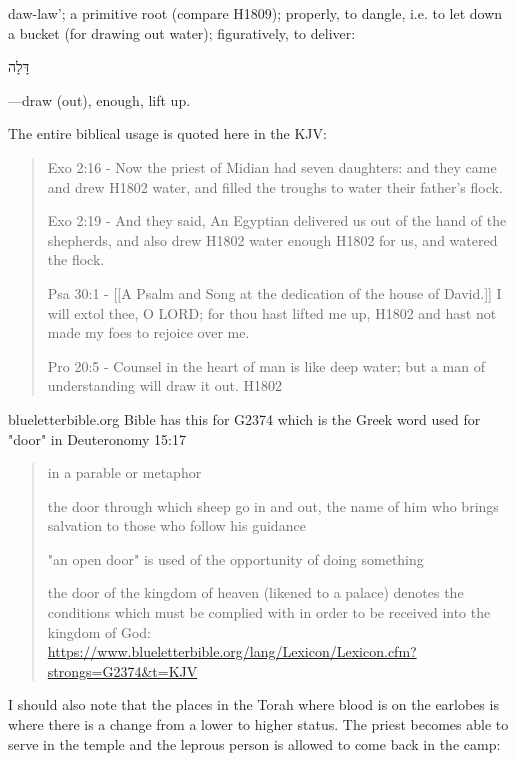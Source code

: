 \documentclass[11pt]{article}
\begin{document}
 daw-law'; a primitive root (compare H1809); properly, to dangle, i.e. to let down a bucket (for drawing out water); figuratively, to deliver:
 \begin{hebrew}
 דָּלָה        
 \end{hebrew}
—draw (out), enough, lift up.

The entire biblical usage is quoted here in the KJV:
\begin{quote}
Exo 2:16 - Now the priest of Midian had seven daughters: and they came and drew H1802 water, and filled the troughs to water their father's flock.

Exo 2:19 - And they said, An Egyptian delivered us out of the hand of the shepherds, and also drew H1802 water enough H1802 for us, and watered the flock.

Psa 30:1 - [[A Psalm and Song at the dedication of the house of David.]] I will extol thee, O LORD; for thou hast lifted me up, H1802 and hast not made my foes to rejoice over me.

Pro 20:5 - Counsel in the heart of man is like deep water; but a man of understanding will draw it out. H1802
\end{quote}

blueletterbible.org Bible has this for G2374 which is the Greek word used for "door" in Deuteronomy 15:17
\begin{quote}
in a parable or metaphor

the door through which sheep go in and out, the name of him who brings salvation to those who follow his guidance

"an open door" is used of the opportunity of doing something

the door of the kingdom of heaven (likened to a palace) denotes the conditions which must be complied with in order to be received into the kingdom of God:
\url{https://www.blueletterbible.org/lang/Lexicon/Lexicon.cfm?strongs=G2374&t=KJV}
\end{quote}

I should also note that the places in the Torah where blood is on the earlobes is where there is a change from a lower to higher status. The priest becomes able to serve in the temple and the leprous person is allowed to come back in the camp:
\end{document}
